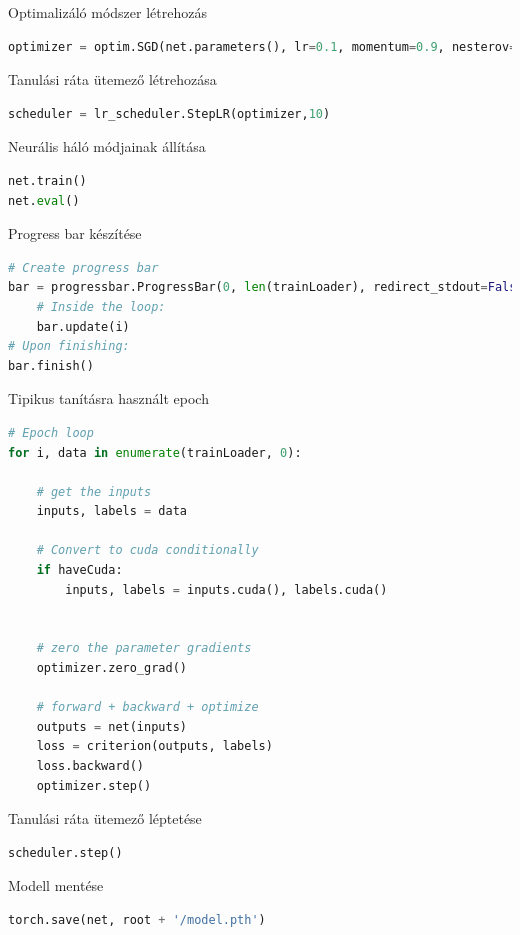 \documentclass[12pt,a4paper,oneside]{report}             %
\begin{document}
Optimalizáló módszer létrehozás

\begin{lstlisting}[language=Python]
optimizer = optim.SGD(net.parameters(), lr=0.1, momentum=0.9, nesterov=True, weight_decay=1e-4)
\end{lstlisting}

Tanulási ráta ütemező létrehozása

\begin{lstlisting}[language=Python]
scheduler = lr_scheduler.StepLR(optimizer,10)
\end{lstlisting}

Neurális háló módjainak állítása

\begin{lstlisting}[language=Python]
net.train()
net.eval()
\end{lstlisting}

Progress bar készítése

\begin{lstlisting}[language=Python]
# Create progress bar
bar = progressbar.ProgressBar(0, len(trainLoader), redirect_stdout=False)
	# Inside the loop:
	bar.update(i)
# Upon finishing:
bar.finish()
\end{lstlisting}

Tipikus tanításra használt epoch

\begin{lstlisting}[language=Python]
# Epoch loop
for i, data in enumerate(trainLoader, 0):

	# get the inputs
	inputs, labels = data
	
	# Convert to cuda conditionally
	if haveCuda:
		inputs, labels = inputs.cuda(), labels.cuda()
	
	
	# zero the parameter gradients
	optimizer.zero_grad()
	
	# forward + backward + optimize
	outputs = net(inputs)
	loss = criterion(outputs, labels)
	loss.backward()
	optimizer.step()
\end{lstlisting}

Tanulási ráta ütemező léptetése

\begin{lstlisting}[language=Python]
scheduler.step()
\end{lstlisting}

Modell mentése

\begin{lstlisting}[language=Python]
torch.save(net, root + '/model.pth')
\end{lstlisting}
\end{document}
